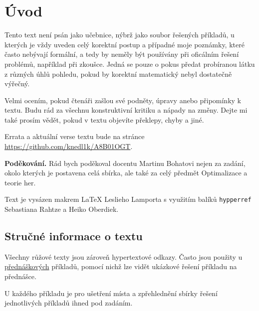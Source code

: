 \section*{Úvod}

\hspace{0.8cm} Tento text není psán jako učebnice, nýbrž jako soubor řešených příkladů, u kterých je vždy uveden celý 
korektní postup a případné moje poznámky, které často nebývají formální, a tedy by neměly být používány při oficálním 
řešení problémů, například při zkoušce. Jedná se pouze o pokus předat probíranou látku z různých úhlů pohledu, pokud by 
korektní matematický nebyl dostatečně výřečný.

\hspace{0.8cm} Velmi ocením, pokud čtenáři zašlou své podněty, úpravy anebo připomínky k textu. Budu rád za všechnu 
konstruktivní kritiku a nápady na změny. Dejte mi také prosím vědět, pokud v textu objevíte překlepy, chyby a jiné.

Errata a aktuální verse textu bude na stránce \url{https://github.com/knedl1k/A8B01OGT}.

\textbf{Poděkování.} Rád bych poděkoval docentu Martinu Bohatovi nejen za zadání, okolo kterých je postavena celá sbírka,
ale také za celý předmět Optimalizace a teorie her.

\hspace{0.8cm} Text je vysázen makrem \LaTeX{} Leslieho Lamporta s využitím balíků \texttt{hypperref} \\ 
Sebastiana Rahtze a Heiko Oberdiek. 

\subsection*{Stručné informace o textu}
Všechny růžové texty jsou zároveň hypertextové odkazy. Často jsou použity u  
\href{https://www.youtube.com/watch?list=PLQL6z4JeTTQmbViFsZoQnUC0FjFZrzfjz&v=da8ogC0dtwM}{přednáškových} 
příkladů, pomocí nichž lze vidět ukázkové řešení příkladu na přednášce.

U každého příkladu je pro ušetření místa a zpřehlednění sbírky řešení jednotlivých příkladů ihned pod zadáním.

